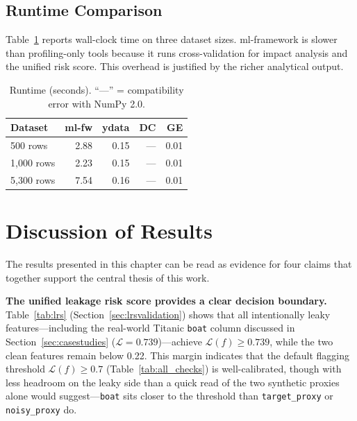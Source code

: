 \documentclass[12pt,a4paper]{report}
\newcommand{\tblhead}{\rowcolor{tblHeadBg}\color{white}\bfseries}
\begin{document}
\subsection{Runtime Comparison}

Table~\ref{tab:runtime} reports wall-clock time on three dataset sizes.  ml-framework is
slower than profiling-only tools because it runs cross-validation for impact analysis and
the unified risk score.  This overhead is justified by the richer analytical output.

\begin{table}[!ht]
\centering
\caption{Runtime (seconds). ``---'' = compatibility error with NumPy 2.0.}
\label{tab:runtime}
\scriptsize
{}
\begin{tabular}{lrrrr}
\toprule
\tblhead \textbf{Dataset} & \textbf{ml-fw} & \textbf{ydata} & \textbf{DC} & \textbf{GE} \\
\midrule
500 rows   & 2.88 & 0.15 & --- & 0.01 \\
1{,}000 rows & 2.23 & 0.15 & --- & 0.01 \\
5{,}300 rows & 7.54 & 0.16 & --- & 0.01 \\
\bottomrule
\end{tabular}
\end{table}

\section{Discussion of Results}
\label{sec:discussionresults}

The results presented in this chapter can be read as evidence for four claims that
together support the central thesis of this work.

\textbf{The unified leakage risk score provides a clear decision boundary.}  Table~\ref{tab:lrs}
(Section~\ref{sec:lrsvalidation}) shows that all intentionally leaky features---including
the real-world Titanic \texttt{boat} column discussed in Section~\ref{sec:casestudies}
($\mathcal{L}{=}0.739$)---achieve $\mathcal{L}(f)\ge0.739$, while the two clean features
remain below 0.22.  This margin indicates that the default flagging threshold
$\mathcal{L}(f)\ge0.7$ (Table~\ref{tab:all_checks}) is well-calibrated, though with less
headroom on the leaky side than a quick read of the two synthetic proxies alone would
suggest---\texttt{boat} sits closer to the threshold than \texttt{target\_proxy} or
\texttt{noisy\_proxy} do.
\end{document}
